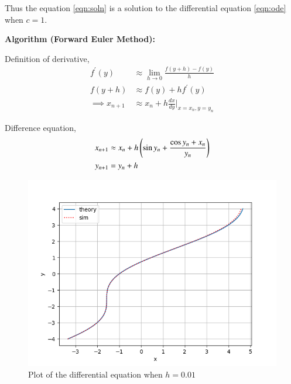 \documentclass[journal]{IEEEtran}
\begin{document}
Thus the equation \eqref{eqn:soln} is a solution to the differential equation \eqref{eqn:ode} when $c = 1$.

\medskip

\textbf{Algorithm (Forward Euler Method):}

Definition of derivative,
\begin{align}
    f^\prime(y) &\approx \lim_{h\to0}\frac{f(y+h)-f(y)}{h} \\
    f(y+h) &\approx f(y)+hf^\prime(y) \\
    \implies x_{n+1} &\approx x_{n} + h\frac{dx}{dy}\Big|_{x=x_{n}, y=y_{n}}
\end{align}

Difference equation,
\begin{align}
    x_{n+1} &\approx x_{n} + h\left(\sin{y_{n} + \frac{\cos{y_{n}} + x_{n}}{y_{n}}}\right) \\
    y_{n+1} &= y_{n}+h
\end{align}

\begin{figure}[h]
    \centering
    \includegraphics[width=\columnwidth]{figs/plot.png}
    \caption{Plot of the differential equation when $h=0.01$}
    \label{fig:Plot1}
    \end{figure}
\end{document}
